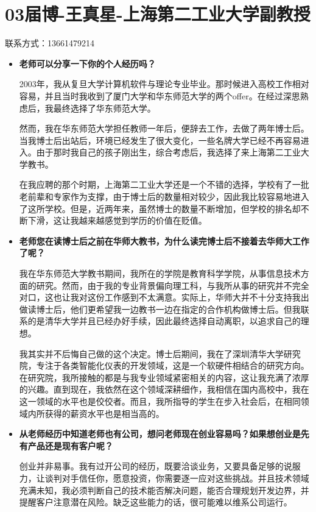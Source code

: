 \newpage
\section{03届博-王真星-上海第二工业大学副教授}
联系方式：13661479214
\begin{itemize}
\setlength{\parindent}{2em} 
    \item \textbf{老师可以分享一下你的个人经历吗？}

 2003年，我从复旦大学计算机软件与理论专业毕业。那时候进入高校工作相对容易，并且当时我收到了厦门大学和华东师范大学的两个offer。在经过深思熟虑后，我最终选择了华东师范大学。

 
然而，我在华东师范大学担任教师一年后，便辞去工作，去做了两年博士后。当我博士后出站后，环境已经发生了很大变化，一些名牌大学已经不再容易进入。由于那时我自己的孩子刚出生，综合考虑后，我选择了来上海第二工业大学教书。


在我应聘的那个时期，上海第二工业大学还是一个不错的选择，学校有了一批老前辈和专家作为支撑，由于博士后的数量相对较少，因此我比较容易地进入了这所学校。但是，近两年来，虽然博士的数量不断增加，但学校的排名却不断下滑，这让我越来越感觉到学历的价值在贬值。


    \item \textbf{老师您在读博士后之前在华师大教书，为什么读完博士后不接着去华师大工作了呢？}

我在华东师范大学教书期间，我所在的学院是教育科学学院，从事信息技术方面的研究。然而，由于我的专业背景偏向理工科，与我所从事的研究并不完全对口，这也让我对这份工作感到不太满意。实际上，华师大并不十分支持我出做读博士后，他们更希望我一边教书一边在指定的合作机构做博士后。但我联系的是清华大学并且已经办好手续，因此最终选择自动离职，以追求自己的理想。


我其实并不后悔自己做的这个决定。博士后期间，我在了深圳清华大学研究院，专注于各类智能化仪表的开发领域，这是一个软硬件相结合的研究方向。在研究院，我所接触的都是与我专业领域紧密相关的内容，这让我充满了浓厚的兴趣。直到现在，我依然在这个领域深耕细作，我相信在国内高校中，我在这一领域的水平也是佼佼者。而且，我所指导的学生在步入社会后，在相同领域内所获得的薪资水平也是相当高的。


    \item \textbf{从老师经历中知道老师也有公司，想问老师现在创业容易吗？如果想创业是先有产品还是现有客户呢？}

创业并非易事。我有过开公司的经历，既要洽谈业务，又要具备足够的说服力，让谈判对手信任你，愿意投资，你需要逐一应对这些挑战。并且技术领域充满未知，我必须判断自己的技术能否解决问题，能否合理规划开发边界，并提醒客户注意潜在风险。缺乏这些能力的话，很可能难以维系公司运行。



\end{itemize}
